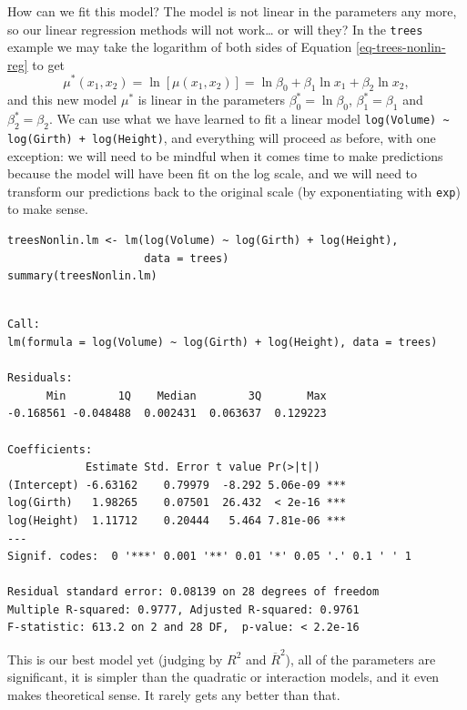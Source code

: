 \documentclass[captions=tableheading]{scrbook}
\begin{document}
How can we fit this model? The model is not linear in the parameters any more, so our linear regression methods will not work\ldots{} or will they? In the \texttt{trees} example we may take the logarithm of both sides of Equation \ref{eq-trees-nonlin-reg} to get
\begin{equation}
\mu^{\ast}(x_{1},x_{2})=\ln\left[\mu(x_{1},x_{2})\right]=\ln\beta_{0}+\beta_{1}\ln x_{1}+\beta_{2}\ln x_{2},
\end{equation}
and this new model \(\mu^{\ast}\) is linear in the parameters \(\beta_{0}^{\ast}=\ln\beta_{0}\), \(\beta_{1}^{\ast}=\beta_{1}\) and \(\beta_{2}^{\ast}=\beta_{2}\). We can use what we have learned to fit a linear model \texttt{log(Volume) \textasciitilde{} log(Girth) + log(Height)}, and everything will proceed as before, with one exception: we will need to be mindful when it comes time to make predictions because the model will have been fit on the log scale, and we will need to transform our predictions back to the original scale (by exponentiating with \texttt{exp}) to make sense.


\begin{verbatim}
treesNonlin.lm <- lm(log(Volume) ~ log(Girth) + log(Height), 
                     data = trees)
summary(treesNonlin.lm)
\end{verbatim}


\begin{verbatim}
 
Call:
lm(formula = log(Volume) ~ log(Girth) + log(Height), data = trees)

Residuals:
      Min        1Q    Median        3Q       Max 
-0.168561 -0.048488  0.002431  0.063637  0.129223 

Coefficients:
            Estimate Std. Error t value Pr(>|t|)    
(Intercept) -6.63162    0.79979  -8.292 5.06e-09 ***
log(Girth)   1.98265    0.07501  26.432  < 2e-16 ***
log(Height)  1.11712    0.20444   5.464 7.81e-06 ***
---
Signif. codes:  0 '***' 0.001 '**' 0.01 '*' 0.05 '.' 0.1 ' ' 1 

Residual standard error: 0.08139 on 28 degrees of freedom
Multiple R-squared: 0.9777,	Adjusted R-squared: 0.9761 
F-statistic: 613.2 on 2 and 28 DF,  p-value: < 2.2e-16
\end{verbatim}

This is our best model yet (judging by \(R^{2}\) and \(\overline{R}^{2}\)), all of the parameters are significant, it is simpler than the quadratic or interaction models, and it even makes theoretical sense. It rarely gets any better than that.
\end{document}
